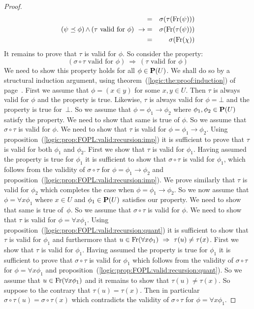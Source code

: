 \begin{proof}
\begin{eqnarray*}
    &=&\sigma(\tau(\free(\psi)))\\
    \mbox{($\psi\preceq\phi$)$\,\land\,$($\tau$ valid for $\phi$)}\ \rightarrow
    &=&\sigma(\free(\tau(\psi)))\\
    &=&\sigma(\free(\chi))
    \end{eqnarray*}
It remains to prove that $\tau$ is valid for $\phi$. So consider the
property:
    \[
    (\mbox{$\sigma\circ\tau$ valid for
    $\phi$})\ \Rightarrow\ (\mbox{$\tau$ valid for $\phi$})
    \]
We need to show this property holds for all $\phi\in{\bf P}(U)$. We
shall do so by a structural induction argument, using
theorem~(\ref{logic:the:proof:induction}) of
page~\pageref{logic:the:proof:induction}. First we assume that
$\phi=(x\in y)$ for some $x,y\in U$. Then $\tau$ is always valid for
$\phi$ and the property is true. Likewise, $\tau$ is always valid
for $\phi=\bot$ and the property is true for~$\bot$. So we assume
that $\phi=\phi_{1}\to\phi_{2}$ where $\phi_{1},\phi_{2}\in{\bf
P}(U)$ satisfy the property. We need to show that same is true of
$\phi$. So we assume that $\sigma\circ\tau$ is valid for $\phi$. We
need to show that $\tau$ is valid for $\phi=\phi_{1}\to\phi_{2}$.
Using proposition~(\ref{logic:prop:FOPL:valid:recursion:imp}) it is
sufficient to prove that $\tau$ is valid for both $\phi_{1}$ and
$\phi_{2}$. First we show that $\tau$ is valid for $\phi_{1}$.
Having assumed the property is true for $\phi_{1}$ it is sufficient
to show that $\sigma\circ\tau$ is valid for $\phi_{1}$, which
follows from the validity of $\sigma\circ\tau$ for
$\phi=\phi_{1}\to\phi_{2}$ and
proposition~(\ref{logic:prop:FOPL:valid:recursion:imp}). We prove
similarly that $\tau$ is valid for $\phi_{2}$ which completes the
case when $\phi=\phi_{1}\to\phi_{2}$. So we now assume that
$\phi=\forall x\phi_{1}$ where $x\in U$ and $\phi_{1}\in{\bf P}(U)$
satisfies our property. We need to show that same is true of~$\phi$.
So we assume that $\sigma\circ\tau$ is valid for $\phi$. We need to
show that $\tau$ is valid for $\phi=\forall x\phi_{1}$. Using
proposition~(\ref{logic:prop:FOPL:valid:recursion:quant}) it is
sufficient to show that $\tau$ is valid for $\phi_{1}$ and
furthermore that $u\in\mbox{\rm Fr}(\forall x\phi_{1})\ \Rightarrow\
\tau(u)\neq\tau(x)$. First we show that $\tau$ is valid for
$\phi_{1}$. Having assumed the property is true for $\phi_{1}$ it is
sufficient to prove that $\sigma\circ\tau$ is valid for $\phi_{1}$
which follows from the validity of $\sigma\circ\tau$ for
$\phi=\forall x\phi_{1}$ and
proposition~(\ref{logic:prop:FOPL:valid:recursion:quant}). So we
assume that $u\in\mbox{\rm Fr}(\forall x\phi_{1})$ and it remains to show
that $\tau(u)\neq\tau(x)$. So suppose to the contrary that
$\tau(u)=\tau(x)$. Then in particular
$\sigma\circ\tau(u)=\sigma\circ\tau(x)$ which contradicts the
validity of $\sigma\circ\tau$ for $\phi=\forall x\phi_{1}$.
\end{proof}


